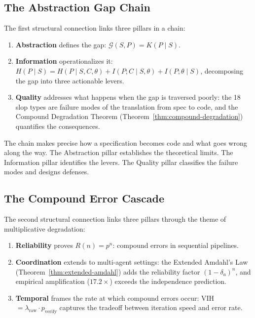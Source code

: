 \documentclass[11pt, a4paper, logo, copyright]{googledeepmind}
\begin{document}
\subsection{The Abstraction Gap Chain}

The first structural connection links three pillars in a chain:

\begin{enumerate}
    \item \textbf{Abstraction} defines the gap: $\mathcal{G}(S,P) = K(P \mid S)$.
    \item \textbf{Information} operationalizes it: $H(P \mid S) = H(P \mid S,C,\theta) + I(P;C \mid S,\theta) + I(P;\theta \mid S)$, decomposing the gap into three actionable levers.
    \item \textbf{Quality} addresses what happens when the gap is traversed poorly: the 18 slop types are failure modes of the translation from spec to code, and the Compound Degradation Theorem (Theorem~\ref{thm:compound-degradation}) quantifies the consequences.
\end{enumerate}

The chain makes precise how a specification becomes code and what goes wrong along the way. The Abstraction pillar establishes the theoretical limits. The Information pillar identifies the levers. The Quality pillar classifies the failure modes and designs defenses.

\subsection{The Compound Error Cascade}

The second structural connection links three pillars through the theme of multiplicative degradation:

\begin{enumerate}
    \item \textbf{Reliability} proves $R(n) = p^n$: compound errors in sequential pipelines.
    \item \textbf{Coordination} extends to multi-agent settings: the Extended Amdahl's Law (Theorem~\ref{thm:extended-amdahl}) adds the reliability factor $(1-\delta_a)^n$, and empirical amplification ($17.2\times$) exceeds the independence prediction.
    \item \textbf{Temporal} frames the rate at which compound errors occur: VIH $= \lambda_{\text{raw}} \cdot p_{\text{verify}}$ captures the tradeoff between iteration speed and error rate.
\end{enumerate}
\end{document}
